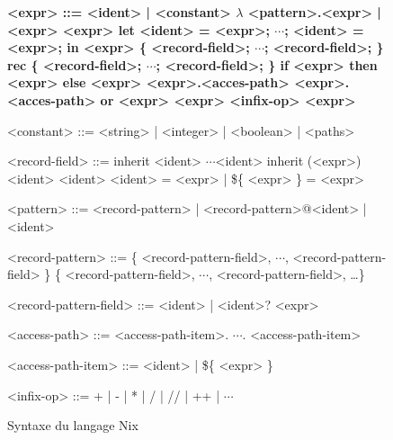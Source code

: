 \begin{figure}
  \def\dots{$\cdots$}
  \begin{grammar}
    \bfseries
    <expr> ::=
    <ident> | <constant>
    \alt $\lambda$ <pattern>.<expr> | <expr> <expr>
    \alt let <ident> = <expr>; \dots; <ident> = <expr>; in <expr>
    \alt [ <expr> \dots <expr> ]
    \alt \{ <record-field>; \dots; <record-field>; \}
    \alt rec \{ <record-field>; \dots; <record-field>; \}
    \alt if <expr> then <expr> else <expr>
    \alt <expr>.<acces-path>
    \alt <expr>.<acces-path> or <expr>
    \alt <expr> <infix-op> <expr>

    <constant> ::= <string> | <integer> | <boolean> | <paths>

    <record-field> ::= inherit <ident> \dots <ident>
    \alt inherit (<expr>) <ident> <ident>
    \alt <ident> = <expr> | \$\{ <expr> \} = <expr>

    <pattern> ::= <record-pattern> | <record-pattern>@<ident> | <ident>

    <record-pattern> ::= \{ <record-pattern-field>, \dots, <record-pattern-field> \}
    \alt \{ <record-pattern-field>, \dots, <record-pattern-field>, \ldots \}

    <record-pattern-field> ::= <ident> | <ident>? <expr>

    <access-path> ::= <access-path-item>. \dots . <access-path-item>

    <access-path-item> ::= <ident> | \$\{ <expr> \}

    <infix-op> ::= + | - | * | / | // | ++ | \dots
  \end{grammar}
  \caption{Syntaxe du langage Nix\label{nix::syntax}}
\end{figure}


